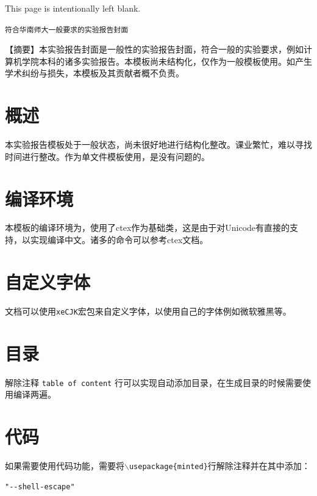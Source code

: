 \documentclass[10.5pt,a4paper,headings]{ctexart}
\newcommand*{\blankpage}{%
\vspace*{\fill}
{\centering\fontsize{32pt}{64pt} This page is intentionally left blank.\par}
\vspace{\fill}}
\begin{document}
\blankpage
\newpage
\tableofcontents

\newpage

\begin{center}
\tt 符合华南师大一般要求的实验报告封面
\end{center}

\setlength{\parindent}{2em}


\onehalfspacing
【摘要】本实验报告封面是一般性的实验报告封面，符合一般的实验要求，例如计算机学院本科的诸多实验报告。本模板尚未结构化，仅作为一般模板使用。如产生学术纠纷与损失，本模板及其贡献者概不负责。

\doublespacing
\section{概述}
本实验报告模板处于一般状态，尚未很好地进行结构化整改。课业繁忙，难以寻找时间进行整改。作为单文件模板使用，是没有问题的。

\section{编译环境}
本模板的编译环境为\XeLaTeX ，使用了ctex作为基础类，这是由于\XeLaTeX 对Unicode有直接的支持，以实现编译中文。诸多的命令可以参考ctex文档。

\section{自定义字体}
文档可以使用\texttt{xeCJK}宏包来自定义字体，以使用自己的字体例如微软雅黑等。

\section{目录}
解除注释 \texttt{table of content} 行可以实现自动添加目录，在生成目录的时候需要使用\XeLaTeX 编译两遍。

\section{代码}
如果需要使用代码功能，需要将\texttt{$\backslash$usepackage\{minted\}}行解除注释并在其中添加：
\begin{verbatim}
"--shell-escape"
\end{verbatim}
\end{document}
